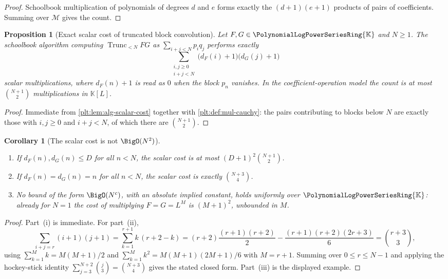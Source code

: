 \documentclass[11pt,oneside]{article}
\theoremstyle{plain}
\newtheorem{proposition}[theorem]{Proposition}
\newtheorem{corollary}[theorem]{Corollary}
\theoremstyle{definition}
\theoremstyle{remark}
\newcommand{\K}{\mathbb{K}}
\newcommand{\PLpow}{\PolynomialLogPowerSeriesRing{\K}}   %
\newcommand{\Trunc}[2]{\operatorname{Trunc}_{<#2}#1}     %
\newcommand{\dprofile}[1]{d_{#1}}                        %
\begin{document}
\begin{proof}
Schoolbook multiplication of polynomials of degrees \(d\) and \(e\) forms
exactly the \((d+1)(e+1)\) products of pairs of coefficients.  Summing over
\(\mathcal M\) gives the count.
\end{proof}

\begin{proposition}[Exact scalar cost of truncated block convolution]
\label{plt:prop:alg-convolution-cost}
Let \(F,G\in\PLpow\) and \(N\ge1\).  The schoolbook algorithm computing
\(\Trunc{FG}{N}\) as \(\sum_{i+j<N}p_iq_j\) performs exactly
\[
 \sum_{\substack{i,j\ge0\\ i+j<N}}
 \bigl(\dprofile{F}(i)+1\bigr)\bigl(\dprofile{G}(j)+1\bigr)
\]
scalar multiplications, where \(\dprofile{F}(n)+1\) is read as \(0\) when the
block \(p_n\) vanishes.  In the coefficient-operation model the count is at
most \(\binom{N+1}{2}\) multiplications in \(\K[L]\).
\end{proposition}

\begin{proof}
Immediate from \cref{plt:lem:alg-scalar-cost} together with
\cref{plt:def:mul-cauchy}: the pairs contributing to blocks below \(N\) are
exactly those with \(i,j\ge0\) and \(i+j<N\), of which there are
\(\binom{N+1}{2}\).
\end{proof}

\begin{corollary}[The scalar cost is not \(\BigO(N^2)\)]
\label{plt:cor:alg-cost-not-quadratic}
\begin{enumerate}
\item If \(\dprofile{F}(n),\dprofile{G}(n)\le D\) for all \(n<N\), the scalar
      cost is at most \((D+1)^2\binom{N+1}{2}\).
\item If \(\dprofile{F}(n)=\dprofile{G}(n)=n\) for all \(n<N\), the scalar cost
      is exactly \(\binom{N+3}{4}\).
\item No bound of the form \(\BigO(N^c)\), with an absolute implied constant,
      holds uniformly over \(\PLpow\): already for \(N=1\) the cost of
      multiplying \(F=G=L^{M}\) is \((M+1)^2\), unbounded in \(M\).
\end{enumerate}
\end{corollary}

\begin{proof}
Part~(i) is immediate.  For part~(ii),
\[
 \sum_{i+j=r}(i+1)(j+1)
 =\sum_{k=1}^{r+1}k\,(r+2-k)
 =(r+2)\frac{(r+1)(r+2)}2-\frac{(r+1)(r+2)(2r+3)}6
 =\binom{r+3}{3},
\]
using \(\sum_{k=1}^{M}k=M(M+1)/2\) and \(\sum_{k=1}^{M}k^2=M(M+1)(2M+1)/6\)
with \(M=r+1\).  Summing over \(0\le r\le N-1\) and applying the hockey-stick
identity \(\sum_{j=3}^{N+2}\binom j3=\binom{N+3}4\) gives the stated closed
form.  Part~(iii) is the displayed example.
\end{proof}
\end{document}
